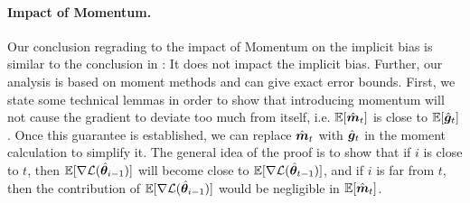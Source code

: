 
\paragraph{Impact of Momentum.} Our conclusion regrading to the impact of Momentum on the implicit bias is similar to the conclusion in \citet{wang2023marginal}: It does not impact the implicit bias. Further, our analysis is based on moment methods and can give exact error bounds. First, we state some technical lemmas in order to show that introducing momentum will not cause the gradient to deviate too much from itself, i.e. $\mathbb{E}[\hat{{\bm{m}}}_t]$ is close to $\mathbb{E}[\hat{{\bm{g}}}_t]$.  Once this guarantee is established, we can replace $\hat{{\bm{m}}}_t$ with $\hat{{\bm{g}}}_t$ in the moment calculation to simplify it. The general idea of the proof is to show that if $i$ is close to $t$, then $\mathbb{E}[\nabla\mathcal{L}(\hat{{\bm{\theta}}}_{i-1})]$ will become close to $\mathbb{E}[\nabla\mathcal{L}(\hat{{\bm{\theta}}}_{t-1})]$, and if $i$ is far from $t$, then the contribution of $\mathbb{E}[\nabla\mathcal{L}(\hat{{\bm{\theta}}}_{i-1})]$ would be negligible in $\mathbb{E}[\hat{{\bm{m}}}_t]$. 

